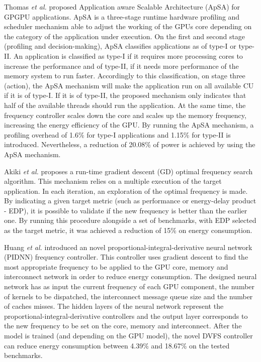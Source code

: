 Thomas \textit{et al.} \cite{thomas_application_2018} proposed Application aware Scalable Architecture (ApSA) for GPGPU applications. ApSA is a three-stage runtime hardware profiling and scheduler mechanism able to adjust the working of the GPUs core depending on the category of the application under execution. On the first and second stage (profiling and decision-making), ApSA classifies applications as of type-I or type-II. An application is classified as type-I if it requires more processing cores to increase the performance and of type-II, if it needs more performance of the memory system to run faster. Accordingly to this classification, on stage three (action), the ApSA mechanism will make the application run on all available CU if it is of type-I. If it is of type-II, the proposed mechanism only indicates that half of the available threads should run the application. At the same time, the frequency controller scales down the core and scales up the memory frequency, increasing the energy efficiency of the GPU. By running the ApSA mechanism, a profiling overhead of 1.6\% for type-I applications and 1.15\% for type-II is introduced. Nevertheless, a reduction of 20.08\% of power is achieved by using the ApSA mechanism.

Akiki \textit{et al.} \cite{akiki_energy-aware_2018} proposes a run-time gradient descent (GD) optimal frequency search algorithm. This mechanism relies on a multiple execution of the target application. In each iteration, an exploration of the optimal frequency is made. By indicating a given target metric (such as performance or energy-delay product - EDP), it is possible to validate if the new frequency is better than the earlier one. By running this procedure alongside a set of benchmarks, with EDP selected as the target metric, it was achieved a reduction of 15\% on energy consumption.

Huang \textit{et al.} \cite{huang_gpu_2019} introduced an novel proportional-integral-derivative neural network (PIDNN) frequency controller. This controller uses gradient descent to find the most appropriate frequency to be applied to the GPU core, memory and interconnect network in order to reduce energy consumption. The designed neural network has as input the current frequency of each GPU component, the number of kernels to be dispatched, the interconnect message queue size and the number of caches misses. The hidden layers of the neural network represent the proportional-integral-derivative controllers and the output layer corresponds to the new frequency to be set on the core, memory and interconnect. After the model is trained (and depending on the GPU model), the novel DVFS controller can reduce energy consumption between 4.39\% and 18.67\% on the tested benchmarks.


